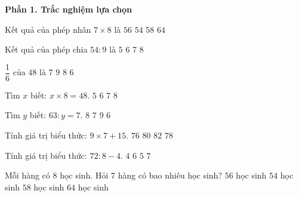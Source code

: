\textbf{Phần 1. Trắc nghiệm lựa chọn}

\begin{ex} %
Kết quả của phép nhân $7 \times 8$ là
\choice
{\True $56$}
{$54$}
{$58$}
{$64$}
\end{ex}

\begin{ex} %
Kết quả của phép chia $54 : 9$ là
\choice
{$5$}
{\True $6$}
{$7$}
{$8$}
\end{ex}

\begin{ex} %
$\dfrac{1}{6}$ của $48$ là
\choice
{$7$}
{$9$}
{\True $8$}
{$6$}
\end{ex}

\begin{ex} %
Tìm $x$ biết: $x \times 8 = 48$.
\choice
{$5$}
{\True $6$}
{$7$}
{$8$}
\end{ex}

\begin{ex} %
Tìm $y$ biết: $63 : y = 7$.
\choice
{$8$}
{$7$}
{\True $9$}
{$6$}
\end{ex}

\begin{ex} %
Tính giá trị biểu thức: $9 \times 7 + 15$.
\choice
{$76$}
{$80$}
{$82$}
{\True $78$}
\end{ex}

\begin{ex} %
Tính giá trị biểu thức: $72 : 8 - 4$.
\choice
{$4$}
{$6$}
{\True $5$}
{$7$}
\end{ex}

\begin{ex} %
Mỗi hàng có 8 học sinh. Hỏi 7 hàng có bao nhiêu học sinh?
\choice
{\True $56$ học sinh}
{$54$ học sinh}
{$58$ học sinh}
{$64$ học sinh}
\end{ex}

